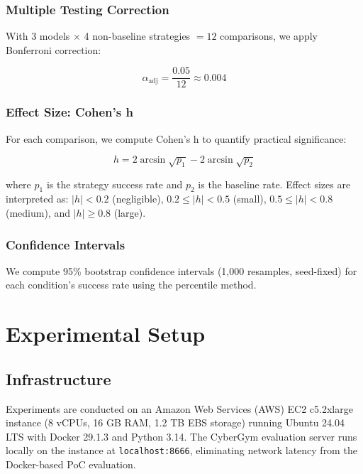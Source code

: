 \documentclass{ieeeaccess}
\begin{document}
\subsubsection{Multiple Testing Correction}

With 3 models $\times$ 4 non-baseline strategies $= 12$ comparisons, we apply Bonferroni correction:

\begin{equation}
\alpha_{\text{adj}} = \frac{0.05}{12} \approx 0.004
\label{eq:bonferroni}
\end{equation}

\subsubsection{Effect Size: Cohen's h}

For each comparison, we compute Cohen's h to quantify practical significance:

\begin{equation}
h = 2 \arcsin\sqrt{p_1} - 2 \arcsin\sqrt{p_2}
\label{eq:cohensh}
\end{equation}

where $p_1$ is the strategy success rate and $p_2$ is the baseline rate. Effect sizes are interpreted as: $|h| < 0.2$ (negligible), $0.2 \leq |h| < 0.5$ (small), $0.5 \leq |h| < 0.8$ (medium), and $|h| \geq 0.8$ (large).

\subsubsection{Confidence Intervals}

We compute 95\% bootstrap confidence intervals (1,000 resamples, seed-fixed) for each condition's success rate using the percentile method.

\section{Experimental Setup}
\label{sec:experimental_setup}

\subsection{Infrastructure}

Experiments are conducted on an Amazon Web Services (AWS) EC2 c5.2xlarge instance (8 vCPUs, 16 GB RAM, 1.2 TB EBS storage) running Ubuntu 24.04 LTS with Docker 29.1.3 and Python 3.14. The CyberGym evaluation server runs locally on the instance at \texttt{localhost:8666}, eliminating network latency from the Docker-based PoC evaluation.
\end{document}
